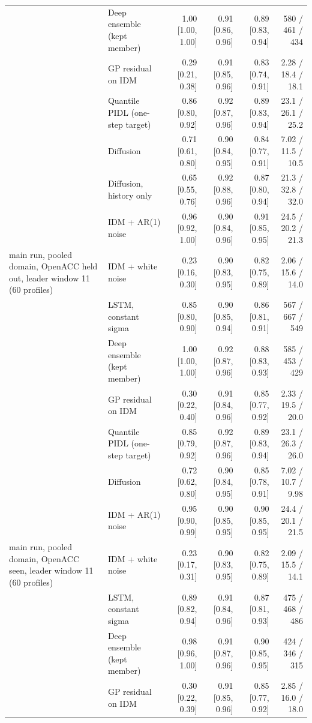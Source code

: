\begin{longtable}{llrrrr}
 & Deep ensemble (kept member) & 1.00 [1.00, 1.00] & 0.91 [0.86, 0.96] & 0.89 [0.83, 0.94] & 580 / 461 / 434 \\
 & GP residual on IDM & 0.29 [0.21, 0.38] & 0.91 [0.85, 0.96] & 0.83 [0.74, 0.91] & 2.28 / 18.4 / 18.1 \\
 & Quantile PIDL (one-step target) & 0.86 [0.80, 0.92] & 0.92 [0.87, 0.96] & 0.89 [0.83, 0.94] & 23.1 / 26.1 / 25.2 \\
 & Diffusion & 0.71 [0.61, 0.80] & 0.90 [0.84, 0.95] & 0.84 [0.77, 0.91] & 7.02 / 11.5 / 10.5 \\
 & Diffusion, history only & 0.65 [0.55, 0.76] & 0.92 [0.88, 0.96] & 0.87 [0.80, 0.94] & 21.3 / 32.8 / 32.0 \\
 & IDM + AR(1) noise & 0.96 [0.92, 1.00] & 0.90 [0.84, 0.96] & 0.91 [0.85, 0.95] & 24.5 / 20.2 / 21.3 \\
\midrule
main run, pooled domain, OpenACC held out, leader window 11 (60 profiles) & IDM + white noise & 0.23 [0.16, 0.30] & 0.90 [0.83, 0.95] & 0.82 [0.75, 0.89] & 2.06 / 15.6 / 14.0 \\
 & LSTM, constant sigma & 0.85 [0.80, 0.90] & 0.90 [0.85, 0.94] & 0.86 [0.81, 0.91] & 567 / 667 / 549 \\
 & Deep ensemble (kept member) & 1.00 [1.00, 1.00] & 0.92 [0.87, 0.96] & 0.88 [0.83, 0.93] & 585 / 453 / 429 \\
 & GP residual on IDM & 0.30 [0.22, 0.40] & 0.91 [0.84, 0.96] & 0.85 [0.77, 0.92] & 2.33 / 19.5 / 20.0 \\
 & Quantile PIDL (one-step target) & 0.85 [0.79, 0.92] & 0.92 [0.87, 0.96] & 0.89 [0.83, 0.94] & 23.1 / 26.3 / 26.0 \\
 & Diffusion & 0.72 [0.62, 0.80] & 0.90 [0.84, 0.95] & 0.85 [0.78, 0.91] & 7.02 / 10.7 / 9.98 \\
 & IDM + AR(1) noise & 0.95 [0.90, 0.99] & 0.90 [0.85, 0.95] & 0.90 [0.85, 0.95] & 24.4 / 20.1 / 21.5 \\
\midrule
main run, pooled domain, OpenACC seen, leader window 11 (60 profiles) & IDM + white noise & 0.23 [0.17, 0.31] & 0.90 [0.83, 0.95] & 0.82 [0.75, 0.89] & 2.09 / 15.5 / 14.1 \\
 & LSTM, constant sigma & 0.89 [0.82, 0.94] & 0.91 [0.84, 0.96] & 0.87 [0.81, 0.93] & 475 / 468 / 486 \\
 & Deep ensemble (kept member) & 0.98 [0.96, 1.00] & 0.91 [0.87, 0.96] & 0.90 [0.85, 0.95] & 424 / 346 / 315 \\
 & GP residual on IDM & 0.30 [0.22, 0.39] & 0.91 [0.85, 0.96] & 0.85 [0.77, 0.92] & 2.85 / 16.0 / 18.0 \\

\end{longtable}
